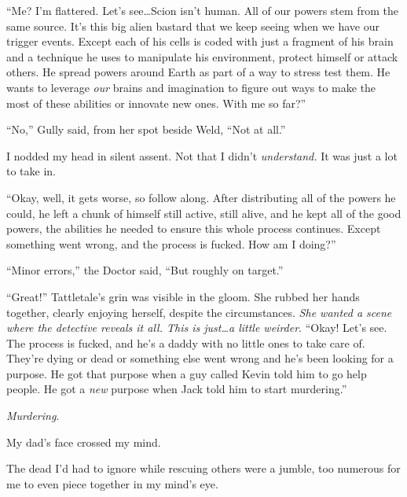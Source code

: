 ``Me?  I'm flattered.  Let's see\ldots Scion isn't human.  All of our powers stem from the same source.  It's this big alien bastard that we keep seeing when we have our trigger events.  Except each of his cells is coded with just a fragment of his brain and a technique he uses to manipulate his environment, protect himself or attack others.  He spread powers around Earth as part of a way to stress test them.  He wants to leverage \emph{our} brains and imagination to figure out ways to make the most of these abilities or innovate new ones.  With me so far?''



``No,'' Gully said, from her spot beside Weld, ``Not at all.''



I nodded my head in silent assent.  Not that I didn't \emph{understand.  }It was just a lot to take in.



``Okay, well, it gets worse, so follow along.  After distributing all of the powers he could, he left a chunk of himself still active, still alive, and he kept all of the good powers, the abilities he needed to ensure this whole process continues.  Except something went wrong, and the process is fucked.  How am I doing?''



``Minor errors,'' the Doctor said, ``But roughly on target.''



``Great!''  Tattletale's grin was visible in the gloom.  She rubbed her hands together, clearly enjoying herself, despite the circumstances.  \emph{She wanted a scene where the detective reveals it all.  This is just\ldots a little weirder}.  ``Okay!  Let's see.  The process is fucked, and he's a daddy with no little ones to take care of.  They're dying or dead or something else went wrong and he's been looking for a purpose.  He got that purpose when a guy called Kevin told him to go help people.  He got a \emph{new} purpose when Jack told him to start murdering.''



\emph{Murdering}.



My dad's face crossed my mind.



The dead I'd had to ignore while rescuing others were a jumble, too numerous for me to even piece together in my mind's eye.



